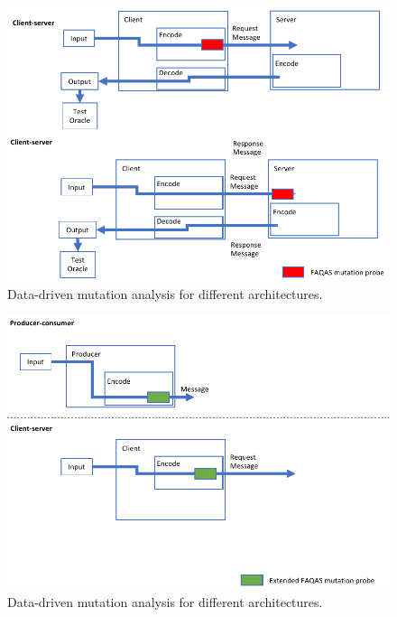\begin{figure}[h]
  \centering
    \includegraphics[width=14cm]{images/dataDrivenTestSuiteAugmentationE}
      \caption{Data-driven mutation analysis for different architectures.}
      \label{fig:dataDrivenTestSuiteAugmentationE}
\end{figure}

\begin{figure}[h]
  \centering
    \includegraphics[width=14cm]{images/dataDrivenTestSuiteAugmentationB}
      \caption{Data-driven mutation analysis for different architectures.}
      \label{fig:dataDrivenTestSuiteAugmentationB}
\end{figure}

\ENDCHANGEDWPT



